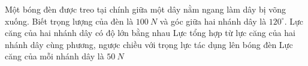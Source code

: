\begin{ex}
Một bóng đèn được treo tại chính giữa một dây nằm ngang làm dây bị võng xuống. Biết trọng lượng của đèn là $100\ N$ và góc giữa hai nhánh dây là $120^{\circ}$. 
{\True Lực căng của hai nhánh dây có độ lớn bằng nhau}
{\True Lực tổng hợp từ lực căng của hai nhánh dây cùng phương, ngược chiều với trọng lực tác dụng lên bóng đèn}
{Lực căng của mỗi nhánh dây là $50\ N$}

 \end{ex}
